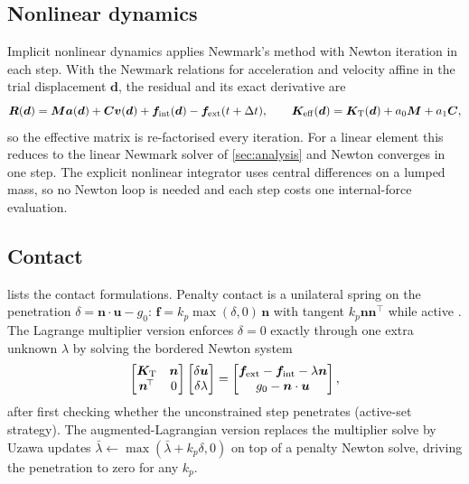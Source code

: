 \subsection{Nonlinear dynamics}
Implicit nonlinear dynamics applies Newmark's method with Newton iteration in each step. With the Newmark relations for acceleration and velocity affine in the trial displacement $\bm d$,
the residual and its exact derivative are
\begin{equation}
  \bm R(\bm d)=\bm{M}\bm a(\bm d)+\bm{C}\bm v(\bm d)+\bm{f}_{\mathrm{int}}(\bm d)-\bm{f}_{\mathrm{ext}}(t+\Delta t),\qquad
  \bm{K}_{\mathrm{eff}}(\bm d)=\bm{K}_{\mathrm{T}}(\bm d)+a_0\bm{M}+a_1\bm{C} ,
  \label{eq:nl-newmark}
\end{equation}
so the effective matrix is re-factorised every iteration. For a linear element this reduces to the linear Newmark solver of \cref{sec:analysis} and Newton converges in one step.
The explicit nonlinear integrator uses central differences on a lumped mass, so no Newton loop is needed and each step costs one internal-force evaluation.

\subsection{Contact}
 lists the contact formulations. Penalty contact is a unilateral spring on the penetration $\delta=\bm n\cdot\bm u-g_0$: $\bm f=k_p\max(\delta,0)\,\bm n$ with tangent $k_p\bm n\bm n^{\!\top}$ while active
\cite{wriggers2006contact}. The Lagrange multiplier version enforces $\delta=0$ exactly through one extra unknown $\lambda$ by solving the bordered Newton system
\begin{equation}
  \begin{bmatrix}\bm{K}_{\mathrm{T}}&\bm n\\ \bm n^{\!\top}&0\end{bmatrix}
  \begin{bmatrix}\delta\bm{u}\\ \delta\lambda\end{bmatrix}=
  \begin{bmatrix}\bm{f}_{\mathrm{ext}}-\bm{f}_{\mathrm{int}}-\lambda\bm n\\ g_0-\bm n\cdot\bm{u}\end{bmatrix},
  \label{eq:kkt}
\end{equation}
after first checking whether the unconstrained step penetrates (active-set strategy). The augmented-Lagrangian version replaces the multiplier solve by Uzawa updates $\bar\lambda\leftarrow\max(\bar\lambda+k_p\delta,0)$
on top of a penalty Newton solve, driving the penetration to zero for any $k_p$.

